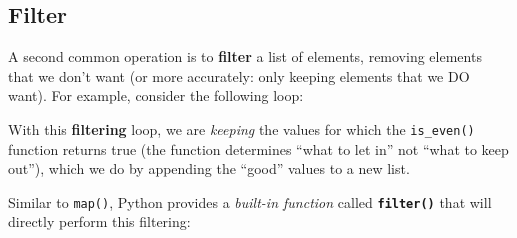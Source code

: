 \documentclass[]{book}
\newenvironment{Shaded}{\begin{snugshade}}{\end{snugshade}}
\newcommand{\KeywordTok}[1]{\textcolor[rgb]{0.13,0.29,0.53}{\textbf{#1}}}
\newcommand{\DecValTok}[1]{\textcolor[rgb]{0.00,0.00,0.81}{#1}}
\newcommand{\CommentTok}[1]{\textcolor[rgb]{0.56,0.35,0.01}{\textit{#1}}}
\newcommand{\ControlFlowTok}[1]{\textcolor[rgb]{0.13,0.29,0.53}{\textbf{#1}}}
\newcommand{\OperatorTok}[1]{\textcolor[rgb]{0.81,0.36,0.00}{\textbf{#1}}}
\newcommand{\BuiltInTok}[1]{#1}
\newcommand{\NormalTok}[1]{#1}
\begin{document}
\hypertarget{filter}{\subsection{Filter}\label{filter}}

A second common operation is to \textbf{filter} a list of elements,
removing elements that we don't want (or more accurately: only keeping
elements that we DO want). For example, consider the following loop:

\begin{Shaded}
\end{Shaded}

With this \textbf{filtering} loop, we are \emph{keeping} the values for
which the \texttt{is\_even()} function returns true (the function
determines ``what to let in'' not ``what to keep out''), which we do by
appending the ``good'' values to a new list.

Similar to \texttt{map()}, Python provides a \emph{built-in function}
called \textbf{\texttt{filter()}} that will directly perform this
filtering:

\begin{Shaded}
\end{Shaded}
\end{document}
